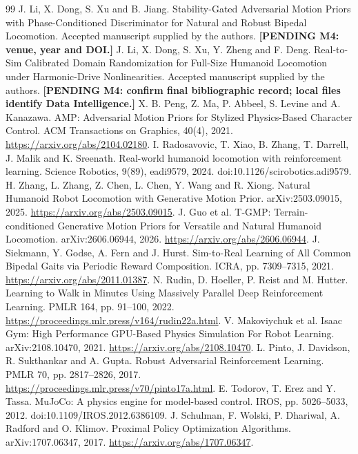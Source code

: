\documentclass[11pt,a4paper]{article}
\newcommand{\pending}[1]{\textbf{[PENDING #1]}}
\begin{document}
\begin{thebibliography}{99}
 J. Li, X. Dong, S. Xu and B. Jiang. Stability-Gated Adversarial Motion Priors with Phase-Conditioned Discriminator for Natural and Robust Bipedal Locomotion. Accepted manuscript supplied by the authors. \pending{M4: venue, year and DOI.}
 J. Li, X. Dong, S. Xu, Y. Zheng and F. Deng. Real-to-Sim Calibrated Domain Randomization for Full-Size Humanoid Locomotion under Harmonic-Drive Nonlinearities. Accepted manuscript supplied by the authors. \pending{M4: confirm final bibliographic record; local files identify Data Intelligence.}
 X. B. Peng, Z. Ma, P. Abbeel, S. Levine and A. Kanazawa. AMP: Adversarial Motion Priors for Stylized Physics-Based Character Control. ACM Transactions on Graphics, 40(4), 2021. \url{https://arxiv.org/abs/2104.02180}.
 I. Radosavovic, T. Xiao, B. Zhang, T. Darrell, J. Malik and K. Sreenath. Real-world humanoid locomotion with reinforcement learning. Science Robotics, 9(89), eadi9579, 2024. doi:10.1126/scirobotics.adi9579.
 H. Zhang, L. Zhang, Z. Chen, L. Chen, Y. Wang and R. Xiong. Natural Humanoid Robot Locomotion with Generative Motion Prior. arXiv:2503.09015, 2025. \url{https://arxiv.org/abs/2503.09015}.
 J. Guo et al. T-GMP: Terrain-conditioned Generative Motion Priors for Versatile and Natural Humanoid Locomotion. arXiv:2606.06944, 2026. \url{https://arxiv.org/abs/2606.06944}.
 J. Siekmann, Y. Godse, A. Fern and J. Hurst. Sim-to-Real Learning of All Common Bipedal Gaits via Periodic Reward Composition. ICRA, pp. 7309--7315, 2021. \url{https://arxiv.org/abs/2011.01387}.
 N. Rudin, D. Hoeller, P. Reist and M. Hutter. Learning to Walk in Minutes Using Massively Parallel Deep Reinforcement Learning. PMLR 164, pp. 91--100, 2022. \url{https://proceedings.mlr.press/v164/rudin22a.html}.
 V. Makoviychuk et al. Isaac Gym: High Performance GPU-Based Physics Simulation For Robot Learning. arXiv:2108.10470, 2021. \url{https://arxiv.org/abs/2108.10470}.
 L. Pinto, J. Davidson, R. Sukthankar and A. Gupta. Robust Adversarial Reinforcement Learning. PMLR 70, pp. 2817--2826, 2017. \url{https://proceedings.mlr.press/v70/pinto17a.html}.
 E. Todorov, T. Erez and Y. Tassa. MuJoCo: A physics engine for model-based control. IROS, pp. 5026--5033, 2012. doi:10.1109/IROS.2012.6386109.
 J. Schulman, F. Wolski, P. Dhariwal, A. Radford and O. Klimov. Proximal Policy Optimization Algorithms. arXiv:1707.06347, 2017. \url{https://arxiv.org/abs/1707.06347}.

\end{thebibliography}
\end{document}
